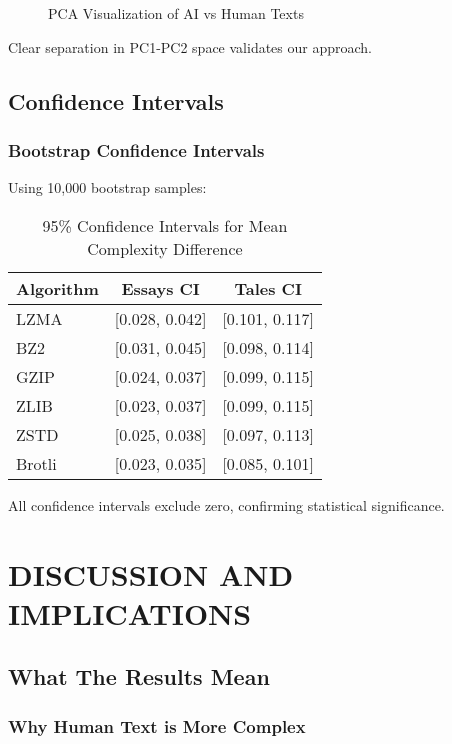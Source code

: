 \documentclass[12pt,a4paper]{report}
\begin{document}
\begin{figure}[h]
\centering
\caption{PCA Visualization of AI vs Human Texts}
\label{fig:pca}
\end{figure}

Clear separation in PC1-PC2 space validates our approach.

\section{Confidence Intervals}

\subsection{Bootstrap Confidence Intervals}

Using 10,000 bootstrap samples:

\begin{table}[h]
\centering
\caption{95\% Confidence Intervals for Mean Complexity Difference}
\begin{tabular}{lcc}
\toprule
\textbf{Algorithm} & \textbf{Essays CI} & \textbf{Tales CI} \\
\midrule
LZMA & [0.028, 0.042] & [0.101, 0.117] \\
BZ2 & [0.031, 0.045] & [0.098, 0.114] \\
GZIP & [0.024, 0.037] & [0.099, 0.115] \\
ZLIB & [0.023, 0.037] & [0.099, 0.115] \\
ZSTD & [0.025, 0.038] & [0.097, 0.113] \\
Brotli & [0.023, 0.035] & [0.085, 0.101] \\
\bottomrule
\end{tabular}
\end{table}

All confidence intervals exclude zero, confirming statistical significance.


\chapter{DISCUSSION AND IMPLICATIONS}

\section{What The Results Mean}

\subsection{Why Human Text is More Complex}
\end{document}
